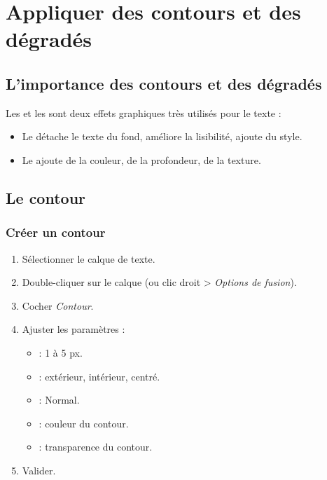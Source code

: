 \section{Appliquer des contours et des dégradés}

\subsection{L'importance des contours et des dégradés}

Les  et les  sont deux effets graphiques très utilisés pour le texte :

\begin{itemize}
    \item Le  détache le texte du fond, améliore la lisibilité, ajoute du style.
    \item Le  ajoute de la couleur, de la profondeur, de la texture.
\end{itemize}

\subsection{Le contour}

\subsubsection{Créer un contour}

\begin{enumerate}
    \item Sélectionner le calque de texte.
    \item Double-cliquer sur le calque (ou clic droit > \emph{Options de fusion}).
    \item Cocher \emph{Contour}.
    \item Ajuster les paramètres :
    \begin{itemize}
        \item {} : 1 à 5 px.
        \item {} : extérieur, intérieur, centré.
        \item {} : Normal.
        \item {} : couleur du contour.
        \item {} : transparence du contour.
    \end{itemize}
    \item Valider.
\end{enumerate}

